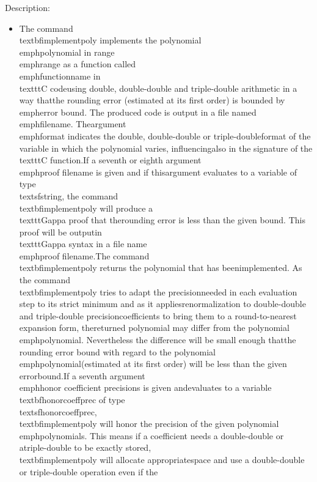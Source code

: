 \noindent Description: \begin{itemize}

\item The command \\textbf{implementpoly} implements the polynomial \\emph{polynomial} in range\n   \\emph{range} as a function called \\emph{functionname} in \\texttt{C} code\n   using double, double-double and triple-double arithmetic in a way that\n   the rounding error (estimated at its first order) is bounded by \\emph{error bound}. \n   The produced code is output in a file named \\emph{filename}. The\n   argument \\emph{format} indicates the double, double-double or triple-double\n   format of the variable in which the polynomial varies, influencing\n   also in the signature of the \\texttt{C} function.\n    \n   If a seventh or eighth argument \\emph{proof filename} is given and if this\n   argument evaluates to a variable of type \\textsf{string}, the command\n   \\textbf{implementpoly} will produce a \\texttt{Gappa} proof that the\n   rounding error is less than the given bound. This proof will be output\n   in \\texttt{Gappa} syntax in a file name \\emph{proof filename}.\n    \n   The command \\textbf{implementpoly} returns the polynomial that has been\n   implemented. As the command \\textbf{implementpoly} tries to adapt the precision\n   needed in each evaluation step to its strict minimum and as it applies\n   renormalization to double-double and triple-double precision\n   coefficients to bring them to a round-to-nearest expansion form, the\n   returned polynomial may differ from the polynomial\n   \\emph{polynomial}. Nevertheless the difference will be small enough that\n   the rounding error bound with regard to the polynomial \\emph{polynomial}\n   (estimated at its first order) will be less than the given error\n   bound.\n    \n   If a seventh argument \\emph{honor coefficient precisions} is given and\n   evaluates to a variable \\textbf{honorcoeffprec} of type \\textsf{honorcoeffprec},\n   \\textbf{implementpoly} will honor the precision of the given polynomial\n   \\emph{polynomials}. This means if a coefficient needs a double-double or a\n   triple-double to be exactly stored, \\textbf{implementpoly} will allocate appropriate\n   space and use a double-double or triple-double operation even if the\n   
\end{itemize}
